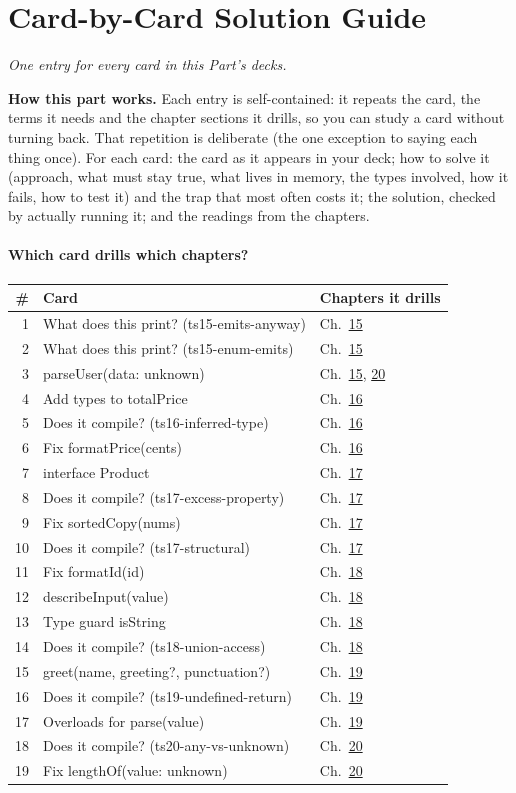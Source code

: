 \documentclass[10pt]{article}
\newcommand{\code}[1]{{\ttfamily\small #1}}
\newcommand{\partq}[2]{\part*{#1}{\small\itshape #2}}
\newcommand{\partline}[2]{\phantomsection\partq{#1}{#2}}  %
\begin{document}
\newpage{}\partline{Card-by-Card Solution Guide}{One entry for every card in this Part's decks.}
\begin{corebox}\textbf{How this part works.} Each entry is self-contained: it repeats the card, the terms it needs and the chapter sections it drills, so you can study a card without turning back. That repetition is deliberate (the one exception to saying each thing once). For each card: the card as it appears in your deck; how to solve it (approach, what must stay true, what lives in memory, the types involved, how it fails, how to test it) and the trap that most often costs it; the solution, checked by actually running it; and the readings from the chapters.\end{corebox}
\subsection*{Which card drills which chapters?}
{\footnotesize\begin{tabularx}{\linewidth}{@{}rXl@{}}\toprule
\textbf{\#} & \textbf{Card} & \textbf{Chapters it drills}\\\midrule
1 & What does this print? (ts15-emits-anyway) & Ch.~\hyperref[ch:c15]{15}\\
2 & What does this print? (ts15-enum-emits) & Ch.~\hyperref[ch:c15]{15}\\
3 & \code{parseUser(data: unknown)} & Ch.~\hyperref[ch:c15]{15}, \hyperref[ch:c20]{20}\\
4 & \code{Add types to totalPrice} & Ch.~\hyperref[ch:c16]{16}\\
5 & Does it compile? (ts16-inferred-type) & Ch.~\hyperref[ch:c16]{16}\\
6 & \code{Fix formatPrice(cents)} & Ch.~\hyperref[ch:c16]{16}\\
7 & \code{interface Product} & Ch.~\hyperref[ch:c17]{17}\\
8 & Does it compile? (ts17-excess-property) & Ch.~\hyperref[ch:c17]{17}\\
9 & \code{Fix sortedCopy(nums)} & Ch.~\hyperref[ch:c17]{17}\\
10 & Does it compile? (ts17-structural) & Ch.~\hyperref[ch:c17]{17}\\
11 & \code{Fix formatId(id)} & Ch.~\hyperref[ch:c18]{18}\\
12 & \code{describeInput(value)} & Ch.~\hyperref[ch:c18]{18}\\
13 & \code{Type guard isString} & Ch.~\hyperref[ch:c18]{18}\\
14 & Does it compile? (ts18-union-access) & Ch.~\hyperref[ch:c18]{18}\\
15 & \code{greet(name, greeting?, punctuation?)} & Ch.~\hyperref[ch:c19]{19}\\
16 & Does it compile? (ts19-undefined-return) & Ch.~\hyperref[ch:c19]{19}\\
17 & \code{Overloads for parse(value)} & Ch.~\hyperref[ch:c19]{19}\\
18 & Does it compile? (ts20-any-vs-unknown) & Ch.~\hyperref[ch:c20]{20}\\
19 & \code{Fix lengthOf(value: unknown)} & Ch.~\hyperref[ch:c20]{20}\\
\bottomrule\end{tabularx}}\par
\end{document}

